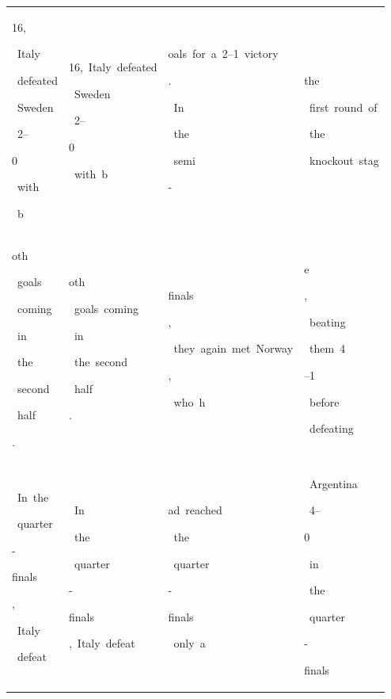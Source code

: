 \begin{table}[h]
\begin{tabular}{ l | l | l | l }
 \colorbox{cm_32!40}{\strut 16,}\colorbox{cm_43!40}{\strut \ Italy}\colorbox{cm_26!40}{\strut \ defeated}\colorbox{cm_17!40}{\strut \ Sweden}\colorbox{cm_27!40}{\strut \ 2–}\colorbox{cm_32!40}{\strut 0}\colorbox{cm_25!40}{\strut \ with}\colorbox{cm_34!40}{\strut \ b} & \colorbox{cm_12!40}{\strut 16,\ Italy\ defeated}\colorbox{cm_0!40}{\strut \ Sweden}\colorbox{cm_12!40}{\strut \ 2–}\colorbox{cm_0!40}{\strut 0}\colorbox{cm_12!40}{\strut \ with\ b} & \colorbox{cm_0!40}{\strut oals\ for\ a\ 2–1\ victory}\colorbox{cm_12!40}{\strut .}\colorbox{cm_0!40}{\strut \ In}\colorbox{cm_12!40}{\strut \ the}\colorbox{cm_25!40}{\strut \ semi}\colorbox{cm_38!40}{\strut -} & \colorbox{cm_25!40}{\strut the}\colorbox{cm_0!40}{\strut \ first\ round\ of}\colorbox{cm_12!40}{\strut \ the}\colorbox{cm_0!40}{\strut \ knockout\ stag} \\ 
 \colorbox{cm_34!40}{\strut oth}\colorbox{cm_31!40}{\strut \ goals}\colorbox{cm_35!40}{\strut \ coming}\colorbox{cm_26!40}{\strut \ in}\colorbox{cm_28!40}{\strut \ the}\colorbox{cm_38!40}{\strut \ second}\colorbox{cm_32!40}{\strut \ half}\colorbox{cm_36!40}{\strut .} & \colorbox{cm_12!40}{\strut oth}\colorbox{cm_0!40}{\strut \ goals\ coming}\colorbox{cm_12!40}{\strut \ in}\colorbox{cm_25!40}{\strut \ the\ second}\colorbox{cm_0!40}{\strut \ half}\colorbox{cm_12!40}{\strut .} & \colorbox{cm_51!40}{\strut finals}\colorbox{cm_63!40}{\strut ,}\colorbox{cm_0!40}{\strut \ they\ again\ met\ Norway}\colorbox{cm_12!40}{\strut ,}\colorbox{cm_0!40}{\strut \ who\ h} & \colorbox{cm_0!40}{\strut e}\colorbox{cm_12!40}{\strut ,}\colorbox{cm_0!40}{\strut \ beating}\colorbox{cm_12!40}{\strut \ them\ 4}\colorbox{cm_0!40}{\strut –1}\colorbox{cm_12!40}{\strut \ before}\colorbox{cm_0!40}{\strut \ defeating} \\ 
 \colorbox{cm_32!40}{\strut \ In\ the}\colorbox{cm_33!40}{\strut \ quarter}\colorbox{cm_32!40}{\strut -}\colorbox{cm_33!40}{\strut finals}\colorbox{cm_32!40}{\strut ,}\colorbox{cm_35!40}{\strut \ Italy}\colorbox{cm_19!40}{\strut \ defeat} & \colorbox{cm_25!40}{\strut \ In}\colorbox{cm_38!40}{\strut \ the}\colorbox{cm_0!40}{\strut \ quarter}\colorbox{cm_12!40}{\strut -}\colorbox{cm_25!40}{\strut finals}\colorbox{cm_12!40}{\strut ,\ Italy\ defeat} & \colorbox{cm_0!40}{\strut ad\ reached}\colorbox{cm_12!40}{\strut \ the}\colorbox{cm_0!40}{\strut \ quarter}\colorbox{cm_12!40}{\strut -}\colorbox{cm_25!40}{\strut finals}\colorbox{cm_0!40}{\strut \ only\ a} & \colorbox{cm_0!40}{\strut \ Argentina}\colorbox{cm_12!40}{\strut \ 4–}\colorbox{cm_0!40}{\strut 0}\colorbox{cm_12!40}{\strut \ in}\colorbox{cm_25!40}{\strut \ the}\colorbox{cm_0!40}{\strut \ quarter}\colorbox{cm_12!40}{\strut -}\colorbox{cm_25!40}{\strut finals} \\ 

\end{tabular}
\end{table}
